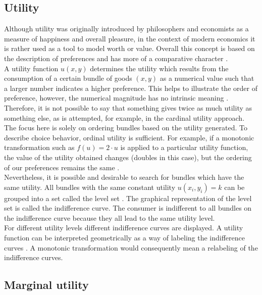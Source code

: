 \subsection{Utility}

Although utility was originally introduced by philosophers and economists as a measure of happiness and overall pleasure, in the context of modern economics it is rather used as a tool to model worth or value. Overall this concept is based on the description of preferences and has more of a comparative character \citep[p. 54]{varian2010intermediate}.\\

\noindent A utility function $u(x, y)$ determines the utility which results from the consumption of a certain bundle of goods $(x, y)$ as a numerical value such that a larger number indicates a higher preference. This helps to illustrate the order of preference, however, the numerical magnitude has no intrinsic meaning \citep[p. 90]{nicholson2016microeconomic}. Therefore, it is not possible to say that something gives twice as much utility as something else, as is attempted, for example, in the cardinal utility approach. The focus here is solely on ordering bundles based on the utility generated. To describe choice behavior, ordinal utility is sufficient. For example, if a monotonic transformation such as $f(u) = 2 \cdot u$ is applied to a particular utility function, the value of the utility obtained changes (doubles in this case), but the ordering of our preferences remains the same \citep[p. 56]{nicholson2016microeconomic}.\\

\noindent Nevertheless, it is possible and desirable to search for bundles which have the same utility. All bundles with the same constant utility $u(x_i, y_i) = k$ can be grouped into a set called the level set \citep[p. 59]{varian2010intermediate}. The graphical representation of the level set is called the indifference curve. The consumer is indifferent to all bundles on the indifference curve because they all lead to the same utility level.\\
For different utility levels different indifference curves are displayed. A utility function can be interpreted geometrically as a way of labeling the indifference curves \citep[p. 57]{varian2010intermediate}. A monotonic transformation would consequently mean a relabeling of the indifference curves.

\bigskip

\subsection{Marginal utility}

